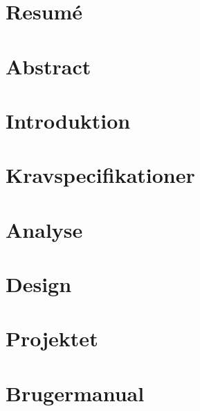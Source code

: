 \documentclass[12pt,oneside,a4paper]{article}
\begin{document}


\newpage
\doublespacing
\renewcommand{\baselinestretch}{1}\normalsize
\tableofcontents
\renewcommand{\baselinestretch}{1}\normalsize
\thispagestyle{fancy} %


\newpage
{} 

\newpage
\section*{Resumé} \label{Res}
 
\section*{Abstract} \label{Abs}
 

\newpage
\section{Introduktion} \label{ch1}
 

\newpage
\section{Kravspecifikationer} \label{ch2}
 

\newpage
\section{Analyse} \label{ch3}
 

\newpage
\section{Design} \label{ch4}
 

\newpage
\section{Projektet} \label{ch5}
 

\newpage
\section{Brugermanual} \label{ch6}
 

\newpage
\end{document}
